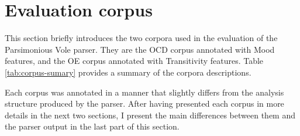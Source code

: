 \section{Evaluation corpus}
\label{sec:corpus}
    
    This section briefly introduces the two corpora used in the evaluation of the Parsimonious Vole parser. They are the OCD corpus annotated with Mood  features, and the OE corpus annotated with Transitivity features. Table \ref{tab:corpus-sumary} provides a summary of the corpora descriptions.  
    
    \begin{table}[!ht]
        \centering
        \caption{Evaluation corpus summary}
        \label{tab:corpus-sumary}
    \end{table}
    
    Each corpus was annotated in a manner that slightly differs from the analysis structure produced by the parser. After having presented each corpus in more details in the next two sections, I present the main differences between them and the parser output in the last part of this section. 
    

